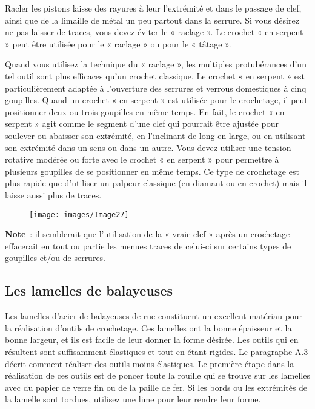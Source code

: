 \documentclass[a4paper,french,11pt,twoside]{report}
\begin{document}
Racler les pistons laisse des rayures à leur l'extrémité et dans le passage de clef, ainsi que de la limaille de métal un peu partout dans la serrure. Si vous désirez ne pas laisser de traces, vous devez éviter le « raclage ». Le crochet « en serpent » peut être utilisée pour le « raclage » ou pour le « tâtage ».

Quand vous utilisez la technique du « raclage », les multiples protubérances d'un tel outil sont plus efficaces qu'un crochet classique. Le crochet « en serpent » est particulièrement adaptée à l'ouverture des serrures et verrous domestiques à cinq goupilles. Quand un crochet « en serpent » est utilisée pour le crochetage, il peut positionner deux ou trois goupilles en même temps. En fait, le crochet « en serpent » agit comme le segment d'une clef qui pourrait être ajustée pour soulever ou abaisser son extrémité, en l'inclinant de long en large, ou en utilisant son extrémité dans un sens ou dans un autre. Vous devez utiliser une tension rotative modérée ou forte avec le crochet « en serpent » pour permettre à plusieurs goupilles de se positionner en même temps. Ce type de crochetage est plus rapide que d'utiliser un palpeur classique (en diamant ou en crochet) mais il laisse aussi plus de traces.

\begin{figure}[ht]
  \begin{center}
    \texttt{[image: images/Image27]}
    \caption{}
\end{center}
\end{figure}

\noindent \textbf{Note}~: il semblerait que l'utilisation de la « vraie clef » après un crochetage effacerait en tout ou partie les menues traces de celui-ci sur certains types de goupilles et/ou de serrures.

\subsection{Les lamelles de balayeuses}

Les lamelles d'acier de balayeuses de rue constituent un excellent matériau pour la réalisation d'outils de crochetage. Ces lamelles ont la bonne épaisseur et la bonne largeur, et ils est facile de leur donner la forme désirée. Les outils qui en résultent sont suffisamment élastiques et tout en étant rigides. Le paragraphe A.3 décrit comment réaliser des outils moins élastiques. Le première étape dans la réalisation de ces outils est de poncer toute la rouille qui se trouve sur les lamelles avec du papier de verre fin ou de la paille de fer. Si les bords ou les extrémités de la lamelle sont tordues, utilisez une lime pour leur rendre leur forme.
\end{document}

